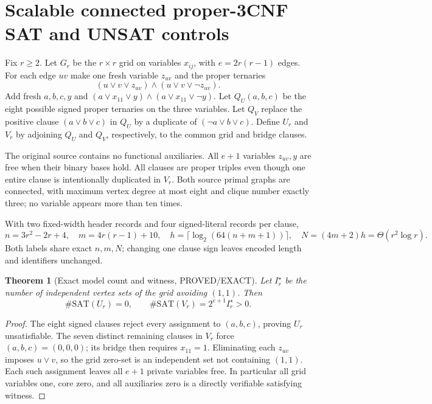 \documentclass[11pt]{article}
\newtheorem{theorem}{Theorem}
\begin{document}
\section{Scalable connected proper-3CNF SAT and UNSAT controls}
Fix $r\ge2$. Let $G_r$ be the $r\times r$ grid on variables $x_{ij}$, with $e=2r(r-1)$ edges. For each edge $uv$ make one fresh variable $z_{uv}$ and the proper ternaries
\[
(u\vee v\vee z_{uv})\wedge(u\vee v\vee\neg z_{uv}).\tag{1}
\]
Add fresh $a,b,c,y$ and $(a\vee x_{11}\vee y)\wedge(a\vee x_{11}\vee\neg y)$. Let $Q_U(a,b,c)$ be the eight possible signed proper ternaries on the three variables. Let $Q_V$ replace the positive clause $(a\vee b\vee c)$ in $Q_U$ by a duplicate of $(\neg a\vee b\vee c)$. Define $U_r$ and $V_r$ by adjoining $Q_U$ and $Q_V$, respectively, to the common grid and bridge clauses.

The original source contains no functional auxiliaries. All $e+1$ variables $z_{uv},y$ are free when their binary bases hold. All clauses are proper triples even though one entire clause is intentionally duplicated in $V_r$. Both source primal graphs are connected, with maximum vertex degree at most eight and clique number exactly three; no variable appears more than ten times.

With two fixed-width header records and four signed-literal records per clause,
\[
 n=3r^2-2r+4,\quad m=4r(r-1)+10,\quad
 h=\lceil\log_2(64(n+m+1))\rceil,\quad N=(4m+2)h
 =\Theta(r^2\log r).\tag{2}
\]
Both labels share exact $n,m,N$; changing one clause sign leaves encoded length and identifiers unchanged.

\begin{theorem}[Exact model count and witness, PROVED/EXACT]
Let $I_r^\star$ be the number of independent vertex sets of the grid avoiding $(1,1)$. Then
\[
 \#\mathrm{SAT}(U_r)=0,\qquad
 \#\mathrm{SAT}(V_r)=2^{e+1}I_r^\star>0.\tag{3}
\]
\end{theorem}
\begin{proof}
The eight signed clauses reject every assignment to $(a,b,c)$, proving $U_r$ unsatisfiable. The seven distinct remaining clauses in $V_r$ force $(a,b,c)=(0,0,0)$; its bridge then requires $x_{11}=1$. Eliminating each $z_{uv}$ imposes $u\vee v$, so the grid zero-set is an independent set not containing $(1,1)$. Each such assignment leaves all $e+1$ private variables free. In particular all grid variables one, core zero, and all auxiliaries zero is a directly verifiable satisfying witness.
\end{proof}
\end{document}
